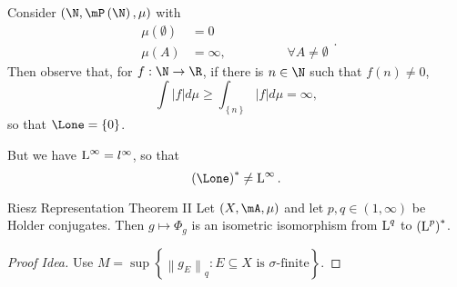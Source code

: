 \documentclass[pmath451]{subfiles}
\begin{document}
    \begin{example}{}
        Consider $\left( \N,\mP\left( \N \right),\mu \right)$ with
        \begin{equation*}
            \begin{aligned}
                \mu\left( \emptyset \right) & = 0 \\
                \mu\left( A \right) & = \infty , \hspace{2cm}\forall A\neq\emptyset
            \end{aligned} .
        \end{equation*}
        Then observe that, for $f:\N\to\R$, if there is $n\in\N$ such that $f\left( n \right)\neq 0$,
        \begin{equation*}
            \int\left| f \right|d\mu\geq\int_{\left\lbrace n \right\rbrace}\left| f \right|d\mu = \infty,
        \end{equation*}
        so that $\Lone=\left\lbrace 0 \right\rbrace$.

        But we have $\operatorname{L}^{\infty} = l^{\infty}$, so that
        \begin{equation*}
            \left( \Lone \right)^{*} \neq \LLL^{\infty}.
        \end{equation*}
    \end{example}

    \rruleline

    \begin{theorem}{Riesz Representation Theorem II}
        Let $\left( X,\mA,\mu \right)$ and let $p,q\in\left( 1,\infty \right)$ be Holder conjugates. Then $g\mapsto\Phi_g$ is an isometric isomorphism from $\operatorname{L}^q$ to $\left( \operatorname{L}^p \right)^{*}$.
    \end{theorem}

    \begin{proof}[Proof Idea]
        Use $M = \sup\left\lbrace \left\lVert g_E\right\rVert_q : E\subseteq X \text{ is $\sigma$-finite} \right\rbrace$.
    \end{proof}
    
    
    
    
    
    
    
    
    
    
    
    
    
    
    
    
    
    
    
    
    
    
    
    
    
    
    
    
    
    
    
    
    
    
    
    
    
\end{document}
